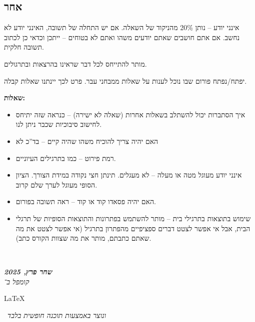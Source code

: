 \documentclass[]{article}
\newcommand\en[1] {\begin{otherlanguage}{english}#1\end{otherlanguage}}
\newcommand\ndoc  {\dotfill \\ \vfil {\begin{center}
			{\textbf{\textit{שחר פרץ, 2025}} \\
				\scriptsize \textit{קומפל ב־}\en{\LaTeX}\,\textit{ ונוצר באמצעות תוכנה חופשית בלבד}}
	\end{center}} \vfil	}
\theoremstyle{definition}
\begin{document}
	\subsection{אחר}
	אינני יודע – נותן 20\% מהניקוד של השאלה. אם יש התחלה של תשובה, האינני יודע לא נחשב. אם אתם חושבים שאתם יודעים משהו ואתם לא בטוחים – ייתכן וכדאי כן לכתוב תשובה חלקית. 
	
	מותר להתייחס לכל דבר שראינו בהרצאות ובתרגולים. 
	
	יפתח/נפתח פורום שבו נוכל לענות על שאלות ממבחני עבר. פרט לכך יינתנו שאלות קבלה. 
	
	
	\textbf{שאלות: }
	\begin{itemize}
		\item איך הסתברות יכול להשתלב בשאלות אחרות (שאלה לא ישירה) – כנראה שזה יתיחס לחישוב סיבוכיות שכבר ניתן לנו. 
		\item האם יהיה צריך להוכיח משהו שהיה קיים – בד''כ לא
		\item רמת פירוט – כמו בתרגילים העיוניים. 
		\item אינני יודע מעוגל מטה או מעלה – לא מעגלים. תינתן חצי נקודה במידת הצורך. הציון הסופי מעוגל לערך שלם קרוב. 
		\item האם יהיה פסאדו קוד או קוד – ראה תשובה בפורום. 
		\item שימוש בתוצאות בתרגילי בית – מותר להשתמש בפתרונות והתוצאות הסופיות של תרגלי הבית, אבל אי אפשר לצטט דברים ספציפיים מהפתרון בתרגיל (אי אפשר לצטט את מה שאתם כתבתם, מותר את מה שצוות הקורס כתב). 
	\end{itemize}
	
	
	
	
	
	
	
	\ndoc
\end{document}
